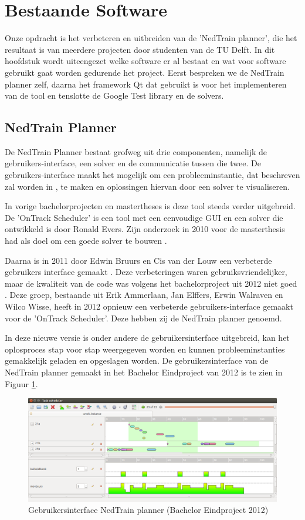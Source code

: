 \section{Bestaande Software}
Onze opdracht is het verbeteren en uitbreiden van de 'NedTrain planner', die het resultaat is van meerdere projecten door studenten van de TU Delft. In dit hoofdstuk wordt uiteengezet welke software er al bestaat en wat voor software gebruikt gaat worden gedurende het project. Eerst bespreken we de NedTrain planner zelf, daarna het framework Qt dat gebruikt is voor het implementeren van de tool en tenslotte de Google Test library en de solvers.

\subsection{NedTrain Planner}
\label{subsec:planner}
De NedTrain Planner bestaat grofweg uit drie componenten, namelijk de gebruikers-interface, een solver en de communicatie tussen die twee. De gebruikers-interface maakt het mogelijk om een probleeminstantie, dat beschreven zal worden in \cite{subsec:probleem}, te maken en oplossingen hiervan door een solver te visualiseren.

In vorige bachelorprojecten en mastertheses is deze tool steeds verder uitgebreid. De 'OnTrack Scheduler' is een tool met een eenvoudige GUI en een solver die ontwikkeld is door Ronald Evers. Zijn onderzoek in 2010 voor de masterthesis had als doel om een goede solver te bouwen \cite{ronaldevers2010}.

Daarna is in 2011 door Edwin Bruurs en Cis van der Louw een verbeterde gebruikers interface gemaakt \cite{bep2011nedtrain}. Deze verbeteringen waren gebruiksvriendelijker, maar de kwaliteit van de code was volgens het bachelorproject uit 2012 niet goed \cite{bep2012nedtrain}. Deze groep, bestaande uit Erik Ammerlaan, Jan Elffers, Erwin Walraven en Wilco Wisse, heeft in 2012 opnieuw een verbeterde gebruikers-interface gemaakt voor de 'OnTrack Scheduler'. Deze hebben zij de NedTrain planner genoemd.

In deze nieuwe versie is onder andere de gebruikersinterface uitgebreid, kan het oplosproces stap voor stap weergegeven worden en kunnen probleeminstanties gemakkelijk geladen en opgeslagen worden. De gebruikersinterface van de NedTrain planner gemaakt in het Bachelor Eindproject van 2012 is te zien in Figuur \ref{fig:plannergui}.

\begin{figure}[!h]
\label{fig:plannergui}
\centering
\includegraphics[width=\textwidth]{../images/plannergui.png}
\caption{Gebruikersinterface NedTrain planner (Bachelor Eindproject 2012)}
\end{figure}

